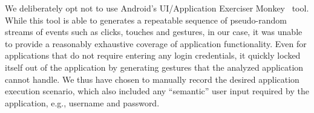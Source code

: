 We deliberately opt not to use Android's UI/Application Exerciser Monkey~\cite{monkey} tool. While this tool is able to  
generates a repeatable sequence of pseudo-random streams of events such as clicks, touches and gestures, in our case, 
it was unable to provide a reasonably exhaustive
coverage of application functionality. Even for applications that do not require entering any login credentials, it quickly locked itself out of the application by generating gestures that the analyzed application cannot handle. 
We thus have chosen to manually record the desired application execution scenario, which also included any ``semantic'' user input required by the application, e.g., username and password. 

\begin{figure}[!t]
    \centering


\end{figure}
